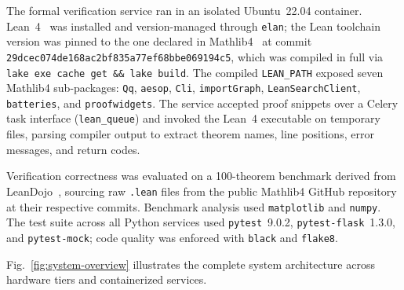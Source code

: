 \documentclass[conference]{IEEEtran}
\begin{document}
The formal verification service ran in an isolated Ubuntu~22.04
container. Lean~4~\cite{ref:lean4} was installed and version-managed
through \texttt{elan}; the Lean toolchain version was pinned to the one
declared in Mathlib4~\cite{ref:mathlib4} at commit
\texttt{29dcec074de168ac2bf835a77ef68bbe069194c5}, which was compiled in
full via \texttt{lake exe cache get \&\& lake build}. The compiled
\texttt{LEAN\_PATH} exposed seven Mathlib4 sub-packages: \texttt{Qq},
\texttt{aesop}, \texttt{Cli}, \texttt{importGraph},
\texttt{LeanSearchClient}, \texttt{batteries}, and
\texttt{proofwidgets}. The service accepted proof snippets over a Celery
task interface (\texttt{lean\_queue}) and invoked the Lean~4 executable
on temporary files, parsing compiler output to extract theorem names,
line positions, error messages, and return codes.

Verification correctness was evaluated on a 100-theorem benchmark derived
from LeanDojo~\cite{ref:leandojo}, sourcing raw \texttt{.lean} files from
the public Mathlib4 GitHub repository at their respective commits.
Benchmark analysis used \texttt{matplotlib} and \texttt{numpy}. The test
suite across all Python services used \texttt{pytest}~9.0.2,
\texttt{pytest-flask}~1.3.0, and \texttt{pytest-mock}; code quality was
enforced with \texttt{black} and \texttt{flake8}.

Fig.~\ref{fig:system-overview} illustrates the complete system
architecture across hardware tiers and containerized services.
\end{document}
